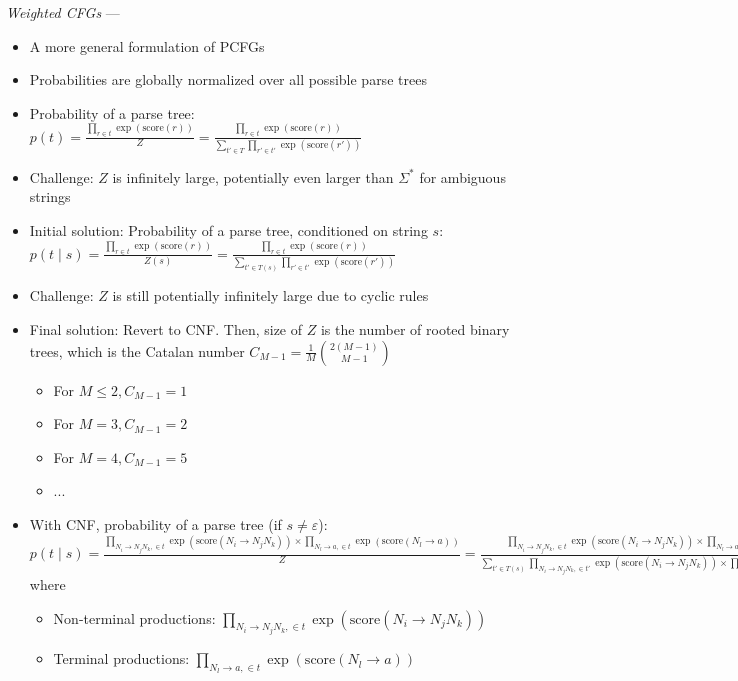 \emph{Weighted CFGs} ---
\begin{itemize}
    \item A more general formulation of PCFGs
    \item Probabilities are globally normalized over all possible parse trees
    \item Probability of a parse tree:
    $
    p(t) = \frac{\prod_{r \in t} \exp(\textrm{score}(r))}{Z} = \frac{\prod_{r \in t} \exp(\textrm{score}(r))}{\sum_{t' \in T} \prod_{r' \in t'} \exp(\textrm{score}(r'))}
    $
    \item Challenge: $Z$ is infinitely large, potentially even larger than $\Sigma^*$ for ambiguous strings
    \item Initial solution: Probability of a parse tree, conditioned on string $s$:
    $
    p(t \mid s) = \frac{\prod_{r \in t} \exp(\textrm{score}(r))}{Z(s)} = \frac{\prod_{r \in t} \exp(\textrm{score}(r))}{\sum_{t' \in T(s)} \prod_{r' \in t'} \exp(\textrm{score}(r'))}
    $
    \item Challenge: $Z$ is still potentially infinitely large due to cyclic rules
    \item Final solution: Revert to CNF. Then, size of $Z$ is the number of rooted binary trees, which is the Catalan number $C_{M-1} = \frac{1}{M} \binom{2(M-1)}{M-1}$
    \begin{itemize}
        \item For $M\leq2, C_{M-1} = 1$
        \item For $M=3, C_{M-1} = 2$
        \item For $M=4, C_{M-1} = 5$
        \item $...$
    \end{itemize}
    \item With CNF, probability of a parse tree (if $s \neq \varepsilon$):
    $p(t \mid s) = \frac{\prod_{N_i \to N_j N_k, \in t} \exp(\textrm{score}(N_i \to N_j N_k)) \times \prod_{N_l \to a, \in t} \exp(\textrm{score}(N_l \to a))}{Z} = \frac{\prod_{N_i \to N_j N_k, \in t} \exp(\textrm{score}(N_i \to N_j N_k)) \times \prod_{N_l \to a, \in t} \exp(\textrm{score}(N_l \to a))}{\sum_{t' \in T(s)} \prod_{N_i \to N_j N_k, \in t'} \exp(\textrm{score}(N_i \to N_j N_k)) \times \prod_{N_l \to a, \in t'} \exp(\textrm{score}(N_l \to a))} $ where
    \begin{itemize}
        \item Non-terminal productions: $\prod_{N_i \to N_j N_k, \in t} \exp(\textrm{score}(N_i \to N_j N_k))$
        \item Terminal productions: $\prod_{N_l \to a, \in t} \exp(\textrm{score}(N_l \to a))$
    \end{itemize}
\end{itemize}

